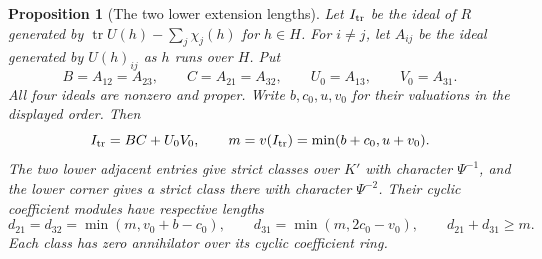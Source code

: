 \documentclass[a4paper,11pt]{article}
\newtheorem{proposition}{Proposition}[section]
\theoremstyle{definition}
\theoremstyle{remark}
\numberwithin{equation}{section}
\begin{document}
\begin{proposition}[The two lower extension lengths]
\label{prop:markededges333}
Let \(I_{\rm tr}\) be the ideal of \(R\) generated by
\(\operatorname{tr}U(h)-\sum_j\chi_j(h)\) for \(h\in H\). For
\(i\ne j\), let \(A_{ij}\) be the ideal generated by \(U(h)_{ij}\)
as \(h\) runs over \(H\). Put
\[
 B=A_{12}=A_{23},\qquad C=A_{21}=A_{32},\qquad
 U_0=A_{13},\qquad V_0=A_{31}.
\]
All four ideals are nonzero and proper. Write \(b,c_0,u,v_0\) for their
valuations in the displayed order. Then
\[
   I_{\rm tr}=BC+U_0V_0,\qquad m=v(I_{\rm tr})
                    =\min(b+c_0,u+v_0).
\]
The two lower adjacent entries give strict classes over \(K'\) with
character \(\Psi^{-1}\), and the lower corner gives a strict class
there with character \(\Psi^{-2}\). Their cyclic coefficient modules
have respective lengths
\[
 d_{21}=d_{32}=\min(m,v_0+b-c_0),\qquad
 d_{31}=\min(m,2c_0-v_0),\qquad d_{21}+d_{31}\ge m .
\]
Each class has zero annihilator over its cyclic coefficient ring.
\end{proposition}
\end{document}
